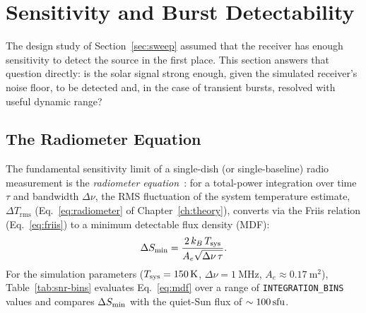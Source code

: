 \section{Sensitivity and Burst Detectability}
\label{sec:snr-analysis}

The design study of Section~\ref{sec:sweep} assumed that the receiver has enough
sensitivity to detect the source in the first place. This section answers that
question directly: is the solar signal strong enough, given the simulated receiver's
noise floor, to be detected and, in the case of transient bursts, resolved with
useful dynamic range?

\subsection{The Radiometer Equation}

The fundamental sensitivity limit of a single-dish (or single-baseline) radio
measurement is the \emph{radiometer equation}~\citep{tms2017,kraus1986}: for a
total-power integration over time $\tau$ and bandwidth $\Delta\nu$, the RMS
fluctuation of the system temperature estimate, $\Delta T_\mathrm{rms}$
(Eq.~\eqref{eq:radiometer} of Chapter~\ref{ch:theory}), converts via the Friis
relation (Eq.~\eqref{eq:friis}) to a minimum detectable flux density (MDF):
\begin{equation}
  \Delta S_{\rm min} = \frac{2\,k_B\,T_{\rm sys}}{A_e\sqrt{\Delta\nu\,\tau}}.
  \label{eq:mdf}
\end{equation}
For the simulation parameters ($T_{\rm sys}=\SI{150}{\kelvin}$,
$\Delta\nu=\SI{1}{\mega\hertz}$, $A_e\approx\SI{0.17}{\metre\squared}$),
Table~\ref{tab:snr-bins} evaluates Eq.~\eqref{eq:mdf} over a range of
\texttt{INTEGRATION\_BINS} values and compares $\Delta S_{\rm min}$ with
the quiet-Sun flux of $\sim\SI{100}{\mathrm{sfu}}$.

